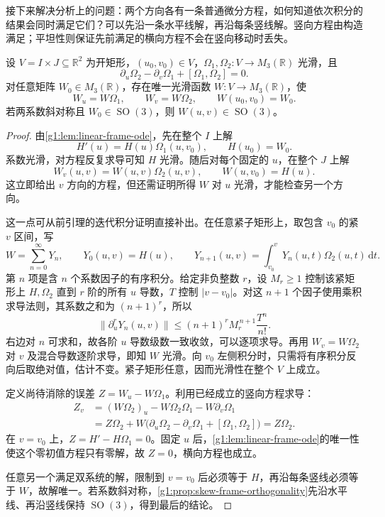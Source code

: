 接下来解决分析上的问题：两个方向各有一条普通微分方程，如何知道依次积分的结果会同时满足它们？可以先沿一条水平线解，再沿每条竖线解。竖向方程由构造满足；平坦性则保证先前满足的横向方程不会在竖向移动时丢失。

\begin{lemma}
	\label{g1:lem:rectangular-matrix-system}
	设 \(V=I\times J\subseteq\mathbb R^2\) 为开矩形，\((u_0,v_0)\in V\)，\(\Omega_1,\Omega_2\colon V\rightarrow M_3(\mathbb R)\) 光滑，且
	\[
		\partial_u\Omega_2-\partial_v\Omega_1+[\Omega_1,\Omega_2]=0.
	\]
	对任意矩阵 \(W_0\in M_3(\mathbb R)\)，存在唯一光滑函数 \(W\colon V\rightarrow M_3(\mathbb R)\)，使
	\[
		W_u=W\Omega_1,\qquad W_v=W\Omega_2,\qquad W(u_0,v_0)=W_0.
	\]
	若两系数斜对称且 \(W_0\in \operatorname{SO}(3)\)，则 \(W(u,v)\in \operatorname{SO}(3)\)。
\end{lemma}

\begin{proof}
	由\cref{g1:lem:linear-frame-ode}，先在整个 \(I\) 上解
	\[
		H'(u)=H(u)\Omega_1(u,v_0),\qquad H(u_0)=W_0.
	\]
	系数光滑，对方程反复求导可知 \(H\) 光滑。随后对每个固定的 \(u\)，在整个 \(J\) 上解
	\[
		W_v(u,v)=W(u,v)\Omega_2(u,v),\qquad W(u,v_0)=H(u).
	\]
	这立即给出 \(v\) 方向的方程，但还需证明所得 \(W\) 对 \(u\) 光滑，才能检查另一个方向。

	这一点可从前引理的迭代积分证明直接补出。在任意紧子矩形上，取包含 \(v_0\) 的紧 \(v\) 区间，写
	\[
		W=\sum_{n=0}^\infty Y_n,\qquad Y_0(u,v)=H(u),\qquad
		Y_{n+1}(u,v)=\int_{v_0}^vY_n(u,t)\Omega_2(u,t)\,\mathrm{d}t.
	\]
	第 \(n\) 项是含 \(n\) 个系数因子的有序积分。给定非负整数 \(r\)，设 \(M_r\geq1\) 控制该紧矩形上 \(H,\Omega_2\) 直到 \(r\) 阶的所有 \(u\) 导数，\(T\) 控制 \(|v-v_0|\)。对这 \(n+1\) 个因子使用乘积求导法则，其系数之和为 \((n+1)^r\)，所以
	\[
		\|\partial_u^r Y_n(u,v)\|
		\leq (n+1)^r M_r^{\,n+1}\frac{T^n}{n!}.
	\]
	右边对 \(n\) 可求和，故各阶 \(u\) 导数级数一致收敛，可以逐项求导。再用 \(W_v=W\Omega_2\) 对 \(v\) 及混合导数逐阶求导，即知 \(W\) 光滑。向 \(v_0\) 左侧积分时，只需将有序积分反向后取绝对值，估计不变。紧子矩形任意，因而光滑性在整个 \(V\) 上成立。

	定义尚待消除的误差 \(Z=W_u-W\Omega_1\)。利用已经成立的竖向方程求导：
	\begin{align*}
		Z_v
		&=(W\Omega_2)_u-W\Omega_2\Omega_1-W\partial_v\Omega_1\\
		&=Z\Omega_2+W\bigl(\partial_u\Omega_2-\partial_v\Omega_1+[\Omega_1,\Omega_2]\bigr)
		=Z\Omega_2.
	\end{align*}
	在 \(v=v_0\) 上，\(Z=H'-H\Omega_1=0\)。固定 \(u\) 后，\cref{g1:lem:linear-frame-ode}的唯一性使这个零初值方程只有零解，故 \(Z=0\)，横向方程也成立。

	任意另一个满足双系统的解，限制到 \(v=v_0\) 后必须等于 \(H\)，再沿每条竖线必须等于 \(W\)，故解唯一。若系数斜对称，\cref{g1:prop:skew-frame-orthogonality}先沿水平线、再沿竖线保持 \(\operatorname{SO}(3)\)，得到最后的结论。
\end{proof}

